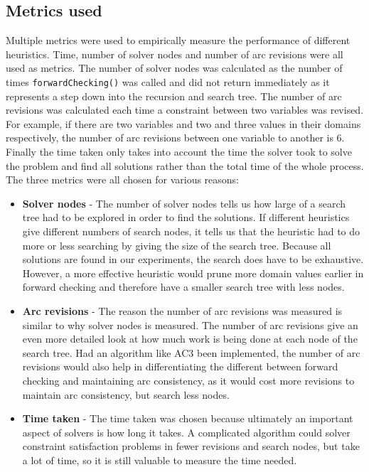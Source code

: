 \documentclass{article}
\begin{document}
\subsection{Metrics used}

Multiple metrics were used to empirically measure the performance of different heuristics. Time, number of solver nodes and number of arc revisions were all used as metrics. The number of solver nodes was calculated as the number of times \texttt{forwardChecking()} was called and did not return immediately as it represents a step down into the recursion and search tree. The number of arc revisions was calculated each time a constraint between two variables was revised. For example, if there are two variables and two and three values in their domains respectively, the number of arc revisions between one variable to another is 6. Finally the time taken only takes into account the time the solver took to solve the problem and find all solutions rather than the total time of the whole process. 
\n
The three metrics were all chosen for various reasons:
\begin{itemize}
\item \textbf{Solver nodes} - The number of solver nodes tells us how large of a search tree had to be explored in order to find the solutions. If different heuristics give different numbers of search nodes, it tells us that the heuristic had to do more or less searching by giving the size of the search tree. Because all solutions are found in our experiments, the search does have to be exhaustive. However, a more effective heuristic would prune more domain values earlier in forward checking and therefore have a smaller search tree with less nodes. 
\item \textbf{Arc revisions} - The reason the number of arc revisions was measured is similar to why solver nodes is  measured. The number of arc revisions give an even more detailed look at how much work is being done at each node of the search tree. Had an algorithm like AC3 been implemented, the number of arc revisions would also help in differentiating the different between forward checking and maintaining arc consistency, as it would cost more revisions to maintain arc consistency, but search less nodes. 
\item \textbf{Time taken} - The time taken was chosen because ultimately an important aspect of solvers is how long it takes. A complicated algorithm could solver constraint satisfaction problems in fewer revisions and search nodes, but take a lot of time, so it is still valuable to measure the time needed. 
\end{itemize}
\end{document}
